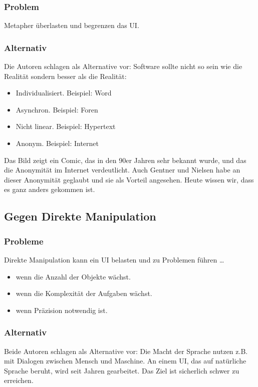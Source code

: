 \subsubsection*{Problem}
Metapher überlasten und begrenzen das UI.
\subsubsection*{Alternativ}
Die Autoren schlagen als Alternative vor: Software sollte nicht so sein wie die Realität sondern besser als die Realität:
\begin{itemize}
\item Individualisiert. Beispiel: Word
\item Asynchron. Beispiel: Foren
\item Nicht linear. Beispiel: Hypertext
\item Anonym. Beispiel: Internet 
\end{itemize}

Das Bild zeigt ein Comic, das in den 90er Jahren sehr bekannt wurde, und das die Anonymität im Internet verdeutlicht. Auch Gentner und Nielsen habe an dieser Anonymität geglaubt und sie als Vorteil angesehen. Heute wissen wir, dass es ganz anders gekommen ist. 

\subsection{Gegen Direkte Manipulation}
\subsubsection*{Probleme}
Direkte Manipulation kann ein UI belasten und zu Problemen führen …
\begin{itemize}
\item wenn die Anzahl der Objekte wächst.
\item wenn die Komplexität der Aufgaben wächst.
\item wenn Präzision notwendig ist.
\end{itemize}

\subsubsection*{Alternativ}
Beide Autoren schlagen als Alternative vor: Die Macht der Sprache nutzen z.B. mit Dialogen zwischen Mensch und Maschine. An einem UI, das auf natürliche Sprache beruht, wird seit Jahren gearbeitet. Das Ziel ist sicherlich schwer zu erreichen.
 
